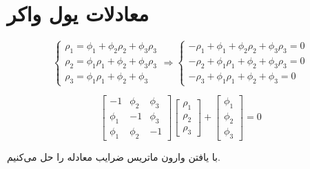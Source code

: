 \documentclass{article}
\begin{document}

\section{معادلات یول واکر}

\[
\begin{cases}
    \rho_1 = \phi_1 + \phi_2\rho_2 + \phi_3 \rho_3 \\
    \rho_2 = \phi_1\rho_1 + \phi_2 + \phi_3 \rho_3 \\
    \rho_3 = \phi_1\rho_1 + \phi_2 + \phi_3 
\end{cases} \Rightarrow \begin{cases}
    - \rho_1 + \phi_1 + \phi_2\rho_2 + \phi_3 \rho_3 = 0 \\
    - \rho_2 + \phi_1\rho_1 + \phi_2 + \phi_3 \rho_3 = 0 \\
    - \rho_3 + \phi_1\rho_1 + \phi_2 + \phi_3 = 0 
\end{cases}
\]

\[ \left[\begin{matrix}
    -1 & \phi_2 & \phi_3 \\
    \phi_1 & -1 & \phi_3 \\
    \phi_1 & \phi_2 & -1
\end{matrix}\right] \left[ \begin{matrix}
    \rho_1 \\ \rho_2 \\ \rho_3
\end{matrix} \right] + \left[ \begin{matrix}
    \phi_1 \\ \phi_2 \\ \phi_3
\end{matrix} \right] = 0
 \]

با یافتن وارون ماتریس ضرایب معادله را حل می‌کنیم.
\end{document}
